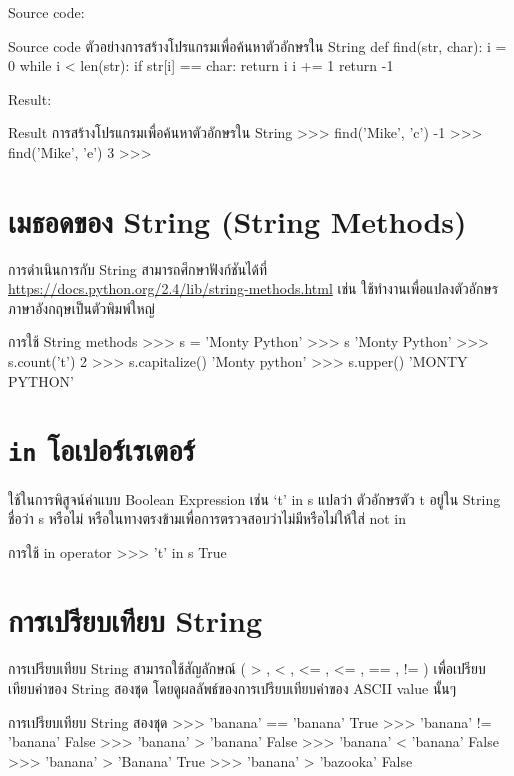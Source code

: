Source code:
\begin{codelist}{Source code ตัวอย่างการสร้างโปรแกรมเพื่อค้นหาตัวอักษรใน String}{}
def find(str, char):
    i = 0
    while i < len(str):
       if str[i] == char: return i
       i += 1
    return -1
\end{codelist}

Result:
\begin{codelist}{Result การสร้างโปรแกรมเพื่อค้นหาตัวอักษรใน String}{}
>>> find('Mike', 'c')
-1
>>> find('Mike', 'e')
3
>>>
\end{codelist}



\section{เมธอดของ String (String Methods)}

การดำเนินการกับ String สามารถศึกษาฟังก์ชันได้ที่ \url{https://docs.python.org/2.4/lib/string-methods.html} เช่น   ใช้ทำงานเพื่อแปลงตัวอักษรภาษาอังกฤษเป็นตัวพิมพ์ใหญ่

\begin{codelist}{การใช้ String methods}{}
>>> s = 'Monty Python'
>>> s
'Monty Python'
>>> s.count('t')
2
>>> s.capitalize()
'Monty python'
>>> s.upper()
'MONTY PYTHON'

\end{codelist}


\section{\texttt{in} โอเปอร์เรเตอร์}

ใช้ในการพิสูจน์ค่าแบบ Boolean Expression เช่น ‘t’ in s แปลว่า ตัวอักษรตัว t อยู่ใน String ชื่อว่า s หรือไม่ หรือในทางตรงข้ามเพื่อการตรวจสอบว่าไม่มีหรือไม่ให้ใส่ not in 

\begin{codelist}{การใช้ in operator}{}
>>> 't' in s
True
\end{codelist}

\section{การเปรียบเทียบ String}

การเปรียบเทียบ String สามารถใช้สัญลักษณ์  ( > , < , <= , <= , == , !=  ) เพื่อเปรียบเทียบค่าของ String สองชุด โดยดูผลลัพธ์ของการเปรียบเทียบค่าของ ASCII value นั้นๆ

\begin{codelist}{การเปรียบเทียบ String สองชุด}{}
>>> 'banana' == 'banana'
True
>>> 'banana' !=  'banana'
False
>>>  'banana' >  'banana'
False
>>>  'banana' <  'banana'
False
>>>  'banana' >  'Banana'
True
>>>  'banana' >  'bazooka'
False
\end{codelist}


